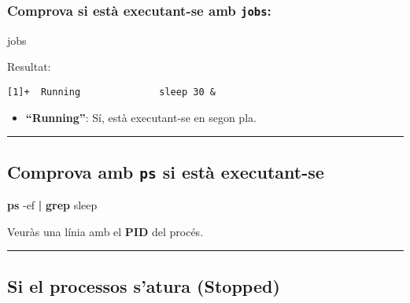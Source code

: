 \documentclass[
  12 pt,
  a4paper,
]{article}
\newenvironment{Shaded}{\begin{snugshade}}{\end{snugshade}}
\newcommand{\AttributeTok}[1]{\textcolor[rgb]{0.13,0.29,0.53}{#1}}
\newcommand{\BuiltInTok}[1]{#1}
\newcommand{\FunctionTok}[1]{\textcolor[rgb]{0.13,0.29,0.53}{\textbf{#1}}}
\newcommand{\KeywordTok}[1]{\textcolor[rgb]{0.13,0.29,0.53}{\textbf{#1}}}
\newcommand{\NormalTok}[1]{#1}
\providecommand{\tightlist}{%
  \setlength{\itemsep}{0pt}\setlength{\parskip}{0pt}}
\begin{document}
\subsubsection{\texorpdfstring{Comprova si està executant-se amb
\texttt{jobs}:}{Comprova si està executant-se amb jobs:}}\label{comprova-si-estuxe0-executant-se-amb-jobs}

\begin{Shaded}
\begin{Highlighting}[]
\BuiltInTok{jobs}
\end{Highlighting}
\end{Shaded}

Resultat:

\begin{verbatim}
[1]+  Running              sleep 30 &
\end{verbatim}

\begin{itemize}
\tightlist
\item
  \textbf{``Running''}: Sí, està executant-se en segon pla.
\end{itemize}

\begin{center}\rule{0.5\linewidth}{0.5pt}\end{center}

\subsection{\texorpdfstring{Comprova amb \texttt{ps} si està
executant-se}{Comprova amb ps si està executant-se}}\label{comprova-amb-ps-si-estuxe0-executant-se}

\begin{Shaded}
\begin{Highlighting}[]
\FunctionTok{ps} \AttributeTok{{-}ef} \KeywordTok{|} \FunctionTok{grep}\NormalTok{ sleep}
\end{Highlighting}
\end{Shaded}

Veuràs una línia amb el \textbf{PID} del procés.

\begin{center}\rule{0.5\linewidth}{0.5pt}\end{center}

\subsection{Si el processos s'atura
(Stopped)}\label{si-el-processos-satura-stopped}
\end{document}
